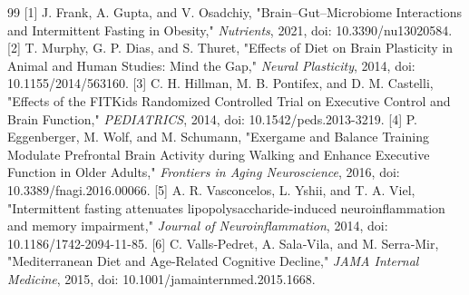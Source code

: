 \documentclass[11pt]{article}
\begin{document}
\begin{thebibliography}{99}
 [1] J. Frank, A. Gupta, and V. Osadchiy, "Brain–Gut–Microbiome Interactions and Intermittent Fasting in Obesity," \textit{Nutrients}, 2021, doi: 10.3390/nu13020584.
 [2] T. Murphy, G. P. Dias, and S. Thuret, "Effects of Diet on Brain Plasticity in Animal and Human Studies: Mind the Gap," \textit{Neural Plasticity}, 2014, doi: 10.1155/2014/563160.
 [3] C. H. Hillman, M. B. Pontifex, and D. M. Castelli, "Effects of the FITKids Randomized Controlled Trial on Executive Control and Brain Function," \textit{PEDIATRICS}, 2014, doi: 10.1542/peds.2013-3219.
 [4] P. Eggenberger, M. Wolf, and M. Schumann, "Exergame and Balance Training Modulate Prefrontal Brain Activity during Walking and Enhance Executive Function in Older Adults," \textit{Frontiers in Aging Neuroscience}, 2016, doi: 10.3389/fnagi.2016.00066.
 [5] A. R. Vasconcelos, L. Yshii, and T. A. Viel, "Intermittent fasting attenuates lipopolysaccharide-induced neuroinflammation and memory impairment," \textit{Journal of Neuroinflammation}, 2014, doi: 10.1186/1742-2094-11-85.
 [6] C. Valls‐Pedret, A. Sala‐Vila, and M. Serra‐Mir, "Mediterranean Diet and Age-Related Cognitive Decline," \textit{JAMA Internal Medicine}, 2015, doi: 10.1001/jamainternmed.2015.1668.
\end{thebibliography}
\end{document}
